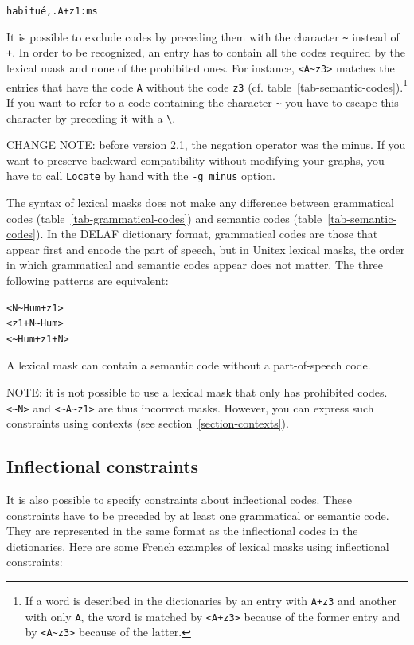 \noindent
\texttt{habitu\'e,.A+z1:ms}

\bigskip
\noindent It is possible to exclude codes by preceding them with the character \verb+~+
instead of \verb$+$.
In order to be recognized, an entry has to contain all the
codes required by the lexical mask and none of the prohibited ones. For instance,
\verb+<A~z3>+ matches the entries that have the code \verb+A+ without the code
\verb+z3+ (cf. table~\ref{tab-semantic-codes}).\footnote{If a word is described in the
dictionaries by an entry with \texttt{A+z3} and another with only \texttt{A}, the word
is matched by \texttt{<A+z3>} because of the former entry and by
\texttt{<A{\textasciitilde}z3>} because of the latter.}
If you want to refer to a code containing the character \verb$~$ you have to
escape this character by preceding it with a \verb+\+. 

\bigskip
\noindent CHANGE NOTE: before version 2.1, the negation operator was the minus. If you want
                       to preserve backward compatibility without modifying your graphs, you have
                       to call \verb+Locate+ by hand with the \verb+-g minus+ option.
\index{\verb+~+}

\bigskip
\noindent The syntax of lexical masks does not make any difference between grammatical codes
(table~\ref{tab-grammatical-codes}) and semantic codes (table~\ref{tab-semantic-codes}).
In the DELAF dictionary format, grammatical codes are those that appear first and
encode the part of speech, but in Unitex lexical masks,
the order in which grammatical and semantic codes appear does not matter. The
three following patterns are equivalent:

\begin{verbatim}
<N~Hum+z1>
<z1+N~Hum>
<~Hum+z1+N>
\end{verbatim}

\noindent A lexical mask can contain a semantic code without a part-of-speech code.

\bigskip
\noindent NOTE: it is not possible to use a lexical mask that only has
prohibited codes. \verb+<~N>+ and \verb+<~A~z1>+ are thus incorrect masks. 
However, you can express
such constraints using contexts (see section~\ref{section-contexts}).


\subsection{Inflectional constraints}
It is also possible to specify constraints about inflectional codes. These
constraints have to be preceded by at least one grammatical or semantic code.
They are represented in the same format as the inflectional codes in the dictionaries.
Here are some French examples of lexical masks using inflectional
constraints:

